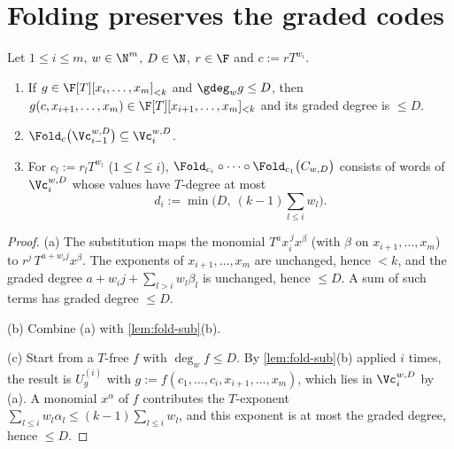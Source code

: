 \section{Folding preserves the graded codes}

\setcounter{lemma}{2}\begin{lemma}[Stability]\label{lem:stab}
Let $1\le i\le m$, $w\in\N^m$, $D\in\N$, $r\in\F$ and $c:=rT^{w_i}$.
\begin{enumerate}
\item[(a)] If $g\in\F[T][x_i,\dots,x_m]_{<k}$ and $\gdeg_w g\le D$, then
$g(c,x_{i+1},\dots,x_m)\in\F[T][x_{i+1},\dots,x_m]_{<k}$ and its graded degree is $\le D$.
\item[(b)] $\Fold_c\big(\Vc_{i-1}^{w,D}\big)\subseteq\Vc_i^{w,D}$.
\item[(c)] For $c_l:=r_lT^{w_l}$ ($1\le l\le i$),
$\Fold_{c_i}\circ\cdots\circ\Fold_{c_1}\big(C_{w,D}\big)$ consists of words of $\Vc_i^{w,D}$ whose
values have $T$-degree at most
\[
d_i:=\min\Big(D,\ (k-1)\sum_{l\le i}w_l\Big).
\]
\end{enumerate}
\end{lemma}

\begin{proof}
(a) The substitution maps the monomial $T^a x_i^{\,j}x^\beta$ (with $\beta$ on
$x_{i+1},\dots,x_m$) to $r^j\,T^{a+w_ij}x^\beta$. The exponents of $x_{i+1},\dots,x_m$ are
unchanged, hence $<k$, and the graded degree $a+w_ij+\sum_{l>i}w_l\beta_l$ is unchanged,
hence $\le D$. A sum of such terms has graded degree $\le D$.

(b) Combine (a) with \cref{lem:fold-sub}(b).

(c) Start from a $T$-free $f$ with $\deg_w f\le D$. By \cref{lem:fold-sub}(b) applied
$i$ times, the result is $U^{(i)}_{g}$ with $g:=f(c_1,\dots,c_i,x_{i+1},\dots,x_m)$, which lies
in $\Vc_i^{w,D}$ by (a). A monomial $x^\alpha$ of $f$ contributes the $T$-exponent
$\sum_{l\le i}w_l\alpha_l\le(k-1)\sum_{l\le i}w_l$, and this exponent is at most the graded
degree, hence $\le D$.
\end{proof}
